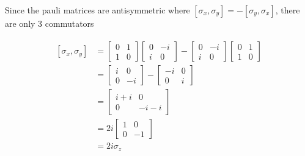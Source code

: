 \documentclass{article}
\begin{document}
\paragraph[short]{} {
    Since the pauli matrices are antisymmetric where $[\sigma_x, \sigma_y] = -[\sigma_y, \sigma_x]$, there are only 3 commutators
}

\begin{align*}
    \begin{split}
    [\sigma_x, \sigma_y] &=
    \begin{bmatrix}
        0 & 1 \\
        1 & 0
    \end{bmatrix}
    \begin{bmatrix}
        0 & -i \\
        i & 0
    \end{bmatrix}
    - \begin{bmatrix}
        0 & -i \\
        i & 0
    \end{bmatrix}
    \begin{bmatrix}
        0 & 1 \\
        1 & 0
    \end{bmatrix} \\
    &= 
    \begin{bmatrix}
        i & 0 \\
        0 & -i
    \end{bmatrix}
    - \begin{bmatrix}
        -i & 0 \\
        0 & i
    \end{bmatrix} \\
    &= \begin{bmatrix}
        i + i & 0 \\
        0 & -i - i
    \end{bmatrix} \\
    &= 2i \begin{bmatrix}
        1 & 0 \\
        0 & -1
    \end{bmatrix} \\
    &= 2i\sigma_z \\
    \end{split}
\end{align*}
\end{document}
